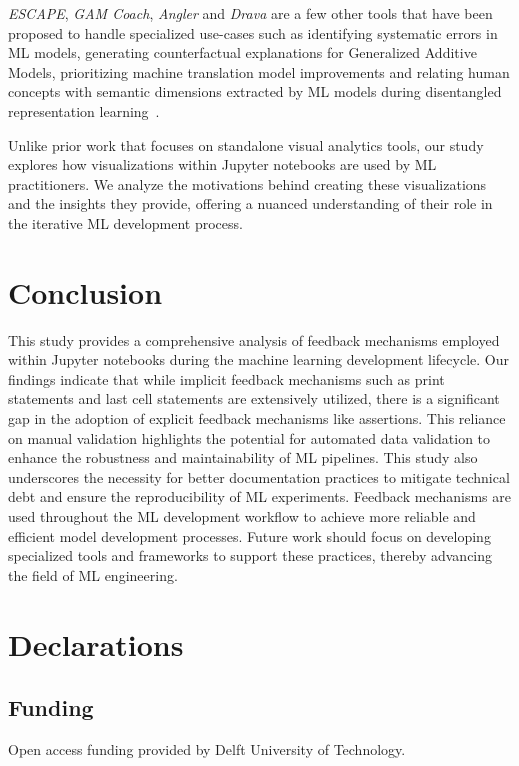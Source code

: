 \documentclass[smallextended]{svjour3}       %
\begin{document}
\textit{ESCAPE}, \textit{GAM Coach}, \textit{Angler} and \textit{Drava} are a few other tools that have been proposed to handle specialized use-cases such as identifying systematic errors in ML models, generating counterfactual explanations for Generalized Additive Models, prioritizing machine translation model improvements and relating human concepts with semantic dimensions extracted by ML models during disentangled representation learning~\citep{ahn2023escape,wang2023gam,robertson2023angler,wang2023drava}.

Unlike prior work that focuses on standalone visual analytics tools, our study explores how visualizations within Jupyter notebooks are used by ML practitioners. We analyze the motivations behind creating these visualizations and the insights they provide, offering a nuanced understanding of their role in the iterative ML development process.

\section{Conclusion}

This study provides a comprehensive analysis of feedback mechanisms employed within Jupyter notebooks during the machine learning development lifecycle. Our findings indicate that while implicit feedback mechanisms such as print statements and last cell statements are extensively utilized, there is a significant gap in the adoption of explicit feedback mechanisms like assertions. This reliance on manual validation highlights the potential for automated data validation to enhance the robustness and maintainability of ML pipelines. This study also underscores the necessity for better documentation practices to mitigate technical debt and ensure the reproducibility of ML experiments. Feedback mechanisms are used throughout the ML development workflow to achieve more reliable and efficient model development processes. Future work should focus on developing specialized tools and frameworks to support these practices, thereby advancing the field of ML engineering.

\section{Declarations}

\subsection{Funding}
Open access funding provided by Delft University of Technology.
\end{document}
